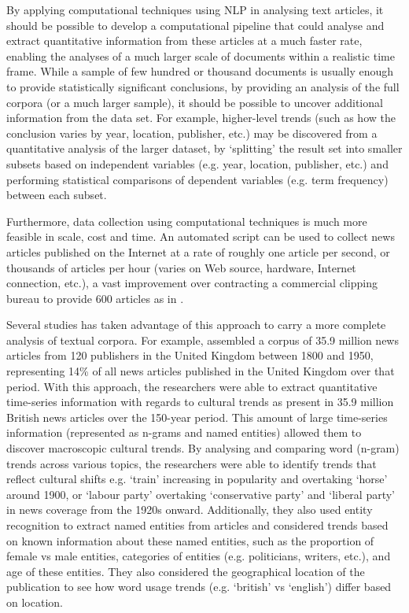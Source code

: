 \documentclass{report}
\begin{document}
By applying computational techniques using NLP in analysing text articles, it should be possible to develop a computational pipeline that could analyse and extract quantitative information from these articles at a much faster rate, enabling the analyses of a much larger scale of documents within a realistic time frame.
While a sample of few hundred or thousand documents is usually enough to provide statistically significant conclusions, by providing an analysis of the full corpora (or a much larger sample), it should be possible to uncover additional information from the data set.
For example, higher-level trends (such as how the conclusion varies by year, location, publisher, etc.) may be discovered from a quantitative analysis of the larger dataset, by `splitting' the result set into smaller subsets based on independent variables (e.g. year, location, publisher, etc.) and performing statistical comparisons of dependent variables (e.g. term frequency) between each subset.

Furthermore, data collection using computational techniques is much more feasible in scale, cost and time. 
An automated script can be used to collect news articles published on the Internet at a rate of roughly one article per second, or thousands of articles per hour (varies on Web source, hardware, Internet connection, etc.), a vast improvement over contracting a commercial clipping bureau to provide 600 articles as in \cite{coverdale2002depictions}.

Several studies has taken advantage of this approach to carry a more complete analysis of textual corpora. 
For example, \cite{lansdall2017content} assembled a corpus of 35.9 million news articles from 120 publishers in the United Kingdom between 1800 and 1950, representing 14\% of all news articles published in the United Kingdom over that period.
With this approach, the researchers were able to extract quantitative time-series information with regards to cultural trends as present in 35.9 million British news articles over the 150-year period.
This amount of large time-series information (represented as n-grams and named entities) allowed them to discover macroscopic cultural trends. 
By analysing and comparing word (n-gram) trends across various topics, the researchers were able to identify trends that reflect cultural shifts e.g. `train' increasing in popularity and overtaking `horse' around 1900, or `labour party' overtaking `conservative party' and `liberal party' in news coverage from the 1920s onward.
Additionally, they also used entity recognition to extract named entities from articles and considered trends based on known information about these named entities, such as the proportion of female vs male entities, categories of entities (e.g. politicians, writers, etc.), and age of these entities.
They also considered the geographical location of the publication to see how word usage trends (e.g. `british' vs `english') differ based on location.
\end{document}
